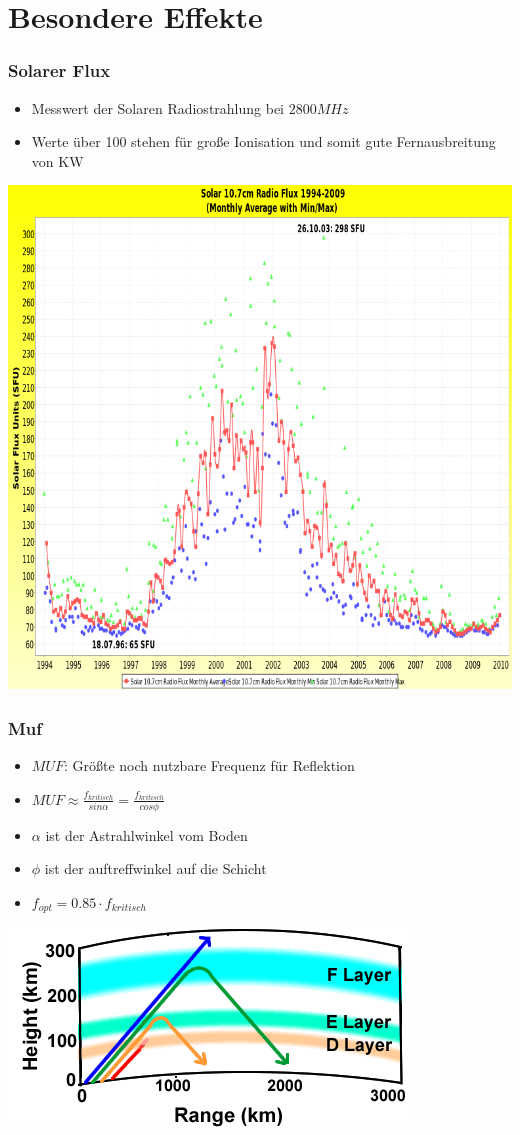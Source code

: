 \section*{Besondere Effekte}

\begin{frame}
    \frametitle{Solarer Flux}
    \begin{itemize}
    			\item Messwert der Solaren Radiostrahlung bei $2800 MHz$
				\item Werte über 100 stehen für große Ionisation und somit gute Fernausbreitung von KW
    \end{itemize}
    \begin{center}
        \includegraphics[width=.6\textwidth]{a08/Solar_10_7_cm_Radio_Flux.png}
    \end{center}
\end{frame}

\begin{frame}
    \frametitle{Muf}
        \begin{center}
    \begin{itemize}
    			\item $MUF$: Größte noch nutzbare Frequenz für Reflektion
    			\item $MUF \approx \frac{f_{kritisch}}{sin{\alpha}} = \frac{f_{kritisch}}{cos{\phi}}$
				\item $\alpha$ ist der Astrahlwinkel vom Boden
				\item $\phi$ ist der auftreffwinkel auf die Schicht
				\item $f_{opt} = 0.85 \cdot f_{kritisch}$
    \end{itemize}
        \includegraphics[width=.6\textwidth]{a08/DifferentFrequencies-NPS.png}
    \end{center}
\end{frame}

